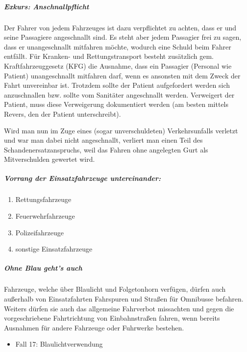
\subparagraph{Exkurs: Anschnallpflicht}

Der Fahrer von jedem Fahrzeuges ist dazu verpflichtet zu
achten, dass er und seine Passagiere angeschnallt
sind. Es steht aber jedem Passagier
frei zu sagen, dass er unangeschnallt mitfahren möchte,
wodurch eine Schuld beim Fahrer entfällt. Für Kranken- und
Rettungstransport besteht zusätzlich gem.
Kraftfahrzeuggesetz (KFG) die Ausnahme, dass ein Passagier
(Personal wie Patient) unangeschnallt mitfahren darf, wenn
es ansonsten mit dem Zweck der Fahrt unvereinbar
ist. Trotzdem sollte
der Patient aufgefordert werden sich anzuschnallen bzw.
sollte vom Sanitäter angeschnallt werden.
Verweigert der Patient, muss diese Verweigerung dokumentiert
werden (am besten mittels Revers, den der Patient
unterschreibt).

Wird man nun im Zuge eines (sogar unverschuldeten)
Verkehrsunfalls verletzt und war man dabei nicht
angeschnallt, verliert man einen Teil des
Schandenersatzanspruchs, weil das Fahren ohne angelegten
Gurt als Mitverschulden gewertet wird.

\subparagraph{Vorrang der Einsatzfahrzeuge untereinander:}

\begin{enumerate}
    \item Rettungsfahrzeuge 
    \item Feuerwehrfahrzeuge
    \item Polizeifahrzeuge
    \item sonstige Einsatzfahrzeuge 
\end{enumerate}


\subparagraph{Ohne Blau geht's auch}

Fahrzeuge, welche über Blaulicht und Folgetonhorn verfügen,
dürfen auch außerhalb von Einsatzfahrten Fahrspuren und
Straßen für Omnibusse befahren. Weiters dürfen sie auch das
allgemeine Fahrverbot missachten und gegen die
vorgeschriebene Fahrtrichtung von Einbahnstraßen
fahren, wenn bereits Ausnahmen für
andere Fahrzeuge oder Fuhrwerke
bestehen.



{
\begin{itemize}
  \item Fall 17: Blaulichtverwendung 
  \dotfill{}
\end{itemize}
}
{}
{}
{}
{}


\ChapterEnd
